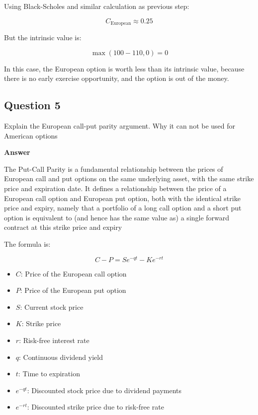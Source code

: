 \documentclass[letterpaper]{article}
\begin{document}
	 Using Black-Scholes and similar calculation as previous step:
	 
	 \[
	 C_{\text{European}} \approx 0.25
	 \]
	 
	 But the intrinsic value is:
	 
	 \[
	 \max(100 - 110, 0) = 0
	 \]
	 
	 In this case, the European option is worth less than its intrinsic value, because there is no early exercise opportunity, and the option is out of the money.
	 
	 \clearpage
	 
	 \subsection*{Question 5}
	 Explain the European call-put parity argument. Why it can not be used for American options
	 
	 \textbf{Answer}
	 
	 The Put-Call Parity is a fundamental relationship between the prices of European call and put options on the same underlying asset, with the same strike price and expiration date. It defines a relationship between the price of a European call option and European put option, both with the identical strike price and expiry, namely that a portfolio of a long call option and a short put option is equivalent to (and hence has the same value as) a single forward contract at this strike price and expiry
	 
	 The formula is:
	 
	 \[
	 C - P = S e^{-qt} - K e^{-rt}
	 \]
	 
	 \begin{itemize}
	 	\item \( C \): Price of the European call option
	 	\item \( P \): Price of the European put option
	 	\item \( S \): Current stock price
	 	\item \( K \): Strike price
	 	\item \( r \): Risk-free interest rate
	 	\item \( q \): Continuous dividend yield
	 	\item \( t \): Time to expiration
	 	\item \( e^{-qt} \): Discounted stock price due to dividend payments
	 	\item \( e^{-rt} \): Discounted strike price due to risk-free rate
	 \end{itemize}
\end{document}

